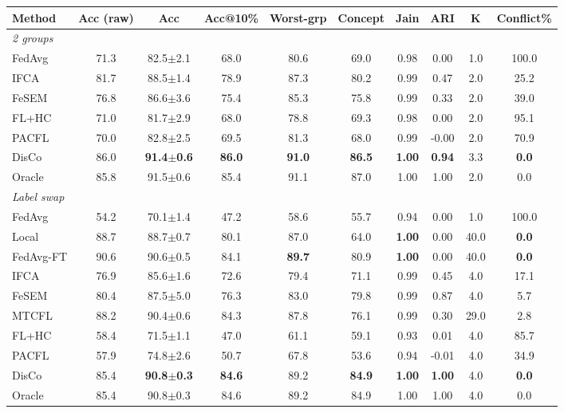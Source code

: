 \scriptsize
\setlength{\tabcolsep}{3.2pt}
\begin{tabular}{lccccccccc}
\toprule
Method & Acc (raw) & Acc & Acc@10\% & Worst-grp & Concept & Jain & ARI & K & Conflict\% \\
\midrule
\multicolumn{10}{l}{\textit{2 groups}}\\
FedAvg & 71.3 & 82.5$\pm$2.1 & 68.0 & 80.6 & 69.0 & 0.98 & 0.00 & 1.0 & 100.0 \\
IFCA & 81.7 & 88.5$\pm$1.4 & 78.9 & 87.3 & 80.2 & 0.99 & 0.47 & 2.0 & 25.2 \\
FeSEM & 76.8 & 86.6$\pm$3.6 & 75.4 & 85.3 & 75.8 & 0.99 & 0.33 & 2.0 & 39.0 \\
FL+HC & 71.0 & 81.7$\pm$2.9 & 68.0 & 78.8 & 69.3 & 0.98 & 0.00 & 2.0 & 95.1 \\
PACFL & 70.0 & 82.8$\pm$2.5 & 69.5 & 81.3 & 68.0 & 0.99 & -0.00 & 2.0 & 70.9 \\
DisCo & 86.0 & \textbf{91.4$\pm$0.6} & \textbf{86.0} & \textbf{91.0} & \textbf{86.5} & \textbf{1.00} & \textbf{0.94} & 3.3 & \textbf{0.0} \\
Oracle & 85.8 & 91.5$\pm$0.6 & 85.4 & 91.1 & 87.0 & 1.00 & 1.00 & 2.0 & 0.0 \\
\midrule
\multicolumn{10}{l}{\textit{Label swap}}\\
FedAvg & 54.2 & 70.1$\pm$1.4 & 47.2 & 58.6 & 55.7 & 0.94 & 0.00 & 1.0 & 100.0 \\
Local & 88.7 & 88.7$\pm$0.7 & 80.1 & 87.0 & 64.0 & \textbf{1.00} & 0.00 & 40.0 & \textbf{0.0} \\
FedAvg-FT & 90.6 & 90.6$\pm$0.5 & 84.1 & \textbf{89.7} & 80.9 & \textbf{1.00} & 0.00 & 40.0 & \textbf{0.0} \\
IFCA & 76.9 & 85.6$\pm$1.6 & 72.6 & 79.4 & 71.1 & 0.99 & 0.45 & 4.0 & 17.1 \\
FeSEM & 80.4 & 87.5$\pm$5.0 & 76.3 & 83.0 & 79.8 & 0.99 & 0.87 & 4.0 & 5.7 \\
MTCFL & 88.2 & 90.4$\pm$0.6 & 84.3 & 87.8 & 76.1 & 0.99 & 0.30 & 29.0 & 2.8 \\
FL+HC & 58.4 & 71.5$\pm$1.1 & 47.0 & 61.1 & 59.1 & 0.93 & 0.01 & 4.0 & 85.7 \\
PACFL & 57.9 & 74.8$\pm$2.6 & 50.7 & 67.8 & 53.6 & 0.94 & -0.01 & 4.0 & 34.9 \\
DisCo & 85.4 & \textbf{90.8$\pm$0.3} & \textbf{84.6} & 89.2 & \textbf{84.9} & \textbf{1.00} & \textbf{1.00} & 4.0 & \textbf{0.0} \\
Oracle & 85.4 & 90.8$\pm$0.3 & 84.6 & 89.2 & 84.9 & 1.00 & 1.00 & 4.0 & 0.0 \\

\end{tabular}
